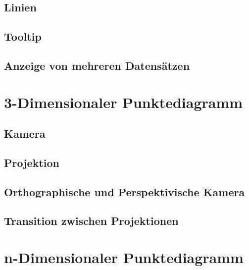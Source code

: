 \subsection{Linien}
\subsection{Tooltip}
\subsection{Anzeige von mehreren Datensätzen}

\section{3-Dimensionaler Punktediagramm}

\subsection{Kamera}
\subsection{Projektion}
\subsection{Orthographische und Perspektivische Kamera}
\subsection{Transition zwischen Projektionen}

\section{n-Dimensionaler Punktediagramm}